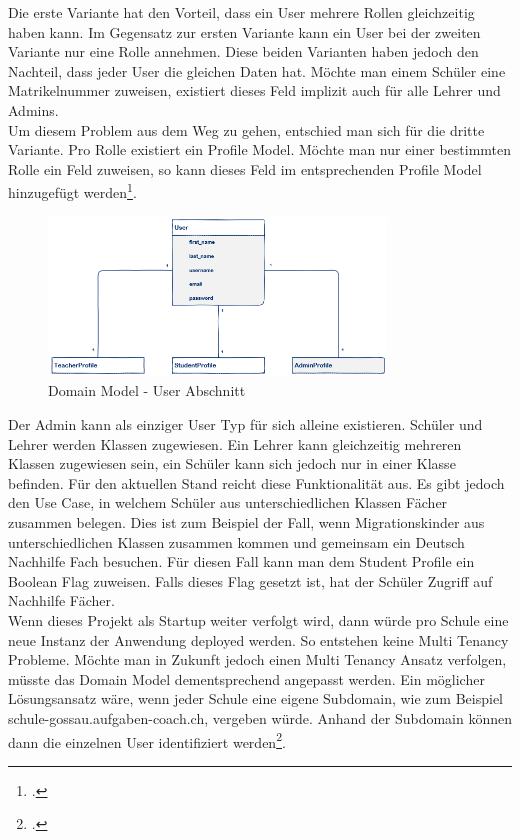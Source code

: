 Die erste Variante hat den Vorteil, dass ein User mehrere Rollen gleichzeitig haben kann. Im Gegensatz zur ersten Variante kann ein User bei der zweiten Variante nur eine Rolle annehmen. Diese beiden Varianten haben jedoch den Nachteil, dass jeder User die gleichen Daten hat. Möchte man einem Schüler eine Matrikelnummer zuweisen, existiert dieses Feld implizit auch für alle Lehrer und Admins. \\
Um diesem Problem aus dem Weg zu gehen, entschied man sich für die dritte Variante. Pro Rolle existiert ein Profile Model. Möchte man nur einer bestimmten Rolle ein Feld zuweisen, so kann dieses Feld im entsprechenden Profile Model hinzugefügt werden\footcite{django:user_types}. \\

\begin{figure}[H]
	\begin{center}
	\includegraphics[width=0.8\textwidth, keepaspectratio]{images/domain_model_user.png}
	\caption{Domain Model - User Abschnitt}
	\label{fig:domain_model_user}
	\end{center}
\end{figure}

\newpage

Der Admin kann als einziger User Typ für sich alleine existieren. Schüler und Lehrer werden Klassen zugewiesen. Ein Lehrer kann gleichzeitig mehreren Klassen zugewiesen sein, ein Schüler kann sich jedoch nur in einer Klasse befinden. Für den aktuellen Stand reicht diese Funktionalität aus. Es gibt jedoch den Use Case, in welchem Schüler aus unterschiedlichen Klassen Fächer zusammen belegen. Dies ist zum Beispiel der Fall, wenn Migrationskinder aus unterschiedlichen Klassen zusammen kommen und gemeinsam ein Deutsch Nachhilfe Fach besuchen. Für diesen Fall kann man dem Student Profile ein Boolean Flag zuweisen. Falls dieses Flag gesetzt ist, hat der Schüler Zugriff auf Nachhilfe Fächer. \\

Wenn dieses Projekt als Startup weiter verfolgt wird, dann würde pro Schule eine neue Instanz der Anwendung deployed werden. So entstehen keine Multi Tenancy Probleme. Möchte man in Zukunft jedoch einen Multi Tenancy Ansatz verfolgen, müsste das Domain Model dementsprechend angepasst werden. Ein möglicher Lösungsansatz wäre, wenn jeder Schule eine eigene Subdomain, wie zum Beispiel schule-gossau.aufgaben-coach.ch, vergeben würde. Anhand der Subdomain können dann die einzelnen User identifiziert werden\footcite{django:multi_tenancy}.

